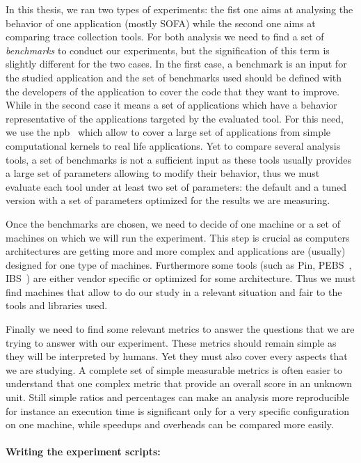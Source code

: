 In this thesis, we ran two types of experiments: the fist one aims at analysing the behavior of one application (mostly \gls{SOFA}) while the second one aims at comparing trace collection tools.
For both analysis we need to find a set of \emph{benchmarks} to conduct our experiments, but the signification of this term is slightly different for the two cases.
In the first case, a benchmark is an input for the studied application and the set of benchmarks used should be defined with the developers of the application to cover the code that they want to improve.
While in the second case it means a set of applications which have a behavior representative of the applications targeted by the evaluated tool.
For this need, we use the \gls{npb}~\cite{Jin99NPBOpenMP} which allow to cover a large set of applications from simple computational kernels to real life applications.
Yet to compare several analysis tools, a set of benchmarks is not a sufficient input as these tools usually provides a large set of parameters allowing to modify their behavior, thus we must evaluate each tool under at least two set of parameters: the default and a tuned version with a set of parameters optimized for the results we are measuring.

Once the benchmarks are chosen, we need to decide of one machine or a set of machines on which we will run the experiment.
This step is crucial as computers architectures are getting more and more complex  and applications are (usually) designed for one type of machines.
Furthermore some tools (such as \gls{Pin}, \gls{PEBS}~\cite{Levinthal09Performance}, \gls{IBS}~\cite{Drongowski07Instructionbased}) are either vendor specific or optimized for some architecture.
Thus we must find machines that allow to do our study in a relevant situation and fair to the tools and libraries used.

Finally we need to find some relevant metrics to answer the questions that we are trying to answer with our experiment.
These metrics should remain simple as they will be interpreted by humans.
Yet they must also cover every aspects that we are studying.
A complete set of simple measurable metrics is often easier to understand that one complex metric that provide an overall score in an unknown unit.
Still simple ratios and percentages can make an analysis more reproducible for instance an execution time is significant only for a very specific configuration on one machine, while speedups and overheads can be compared more easily.


\paragraph{Writing the experiment scripts:}

